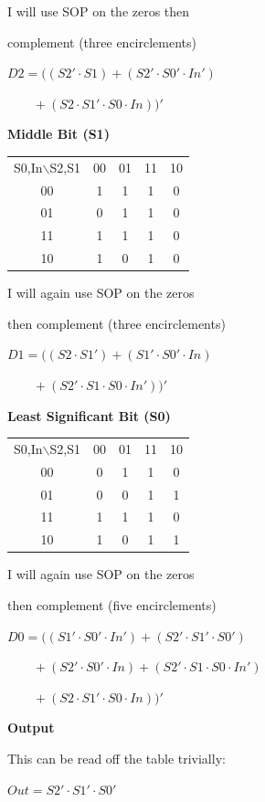 {    \vspace{6pt}

    I will use SOP on the zeros then

    \noindent complement (three encirclements)

    $D2=((S2'\cdot S1)+(S2'\cdot S0'\cdot In')$

    $\qquad +(S2\cdot S1'\cdot S0\cdot In))'$

    \vspace{6pt}


    \textbf{Middle Bit (S1)}

    \begin{tabular}{c|c|c|c|c|}
    \multicolumn{1}{c}{S0,In$\backslash$S2,S1} & \multicolumn{1}{c}{00} & \multicolumn{1}{c}{01} & \multicolumn{1}{c}{11} & \multicolumn{1}{c}{10} \\ \cline{2-5}
    00 & 1 & 1 & 1 & 0 \\ \cline{2-5}
    01 & 0 & 1 & 1 & 0 \\ \cline{2-5}
    11 & 1 & 1 & 1 & 0 \\ \cline{2-5}
    10 & 1 & 0 & 1 & 0 \\ \cline{2-5}
    \end{tabular}

    I will again use SOP on the zeros

    \noindent then complement (three encirclements)

    $D1=((S2\cdot S1')+(S1'\cdot S0'\cdot In)$

    $\qquad +(S2'\cdot S1\cdot S0\cdot In'))'$


    \pagebreak

    \textbf{Least Significant Bit (S0)}

    \begin{tabular}{c|c|c|c|c|}
    \multicolumn{1}{c}{S0,In$\backslash$S2,S1} & \multicolumn{1}{c}{00} & \multicolumn{1}{c}{01} & \multicolumn{1}{c}{11} & \multicolumn{1}{c}{10} \\ \cline{2-5}
    00 & 0 & 1 & 1 & 0 \\ \cline{2-5}
    01 & 0 & 0 & 1 & 1 \\ \cline{2-5}
    11 & 1 & 1 & 1 & 0 \\ \cline{2-5}
    10 & 1 & 0 & 1 & 1 \\ \cline{2-5}
    \end{tabular}

    I will again use SOP on the zeros

    \noindent then complement (five encirclements)

    $D0=((S1'\cdot S0'\cdot In')+(S2'\cdot S1'\cdot S0')$

    $\qquad +(S2'\cdot S0'\cdot In)+(S2'\cdot S1\cdot S0\cdot In')$

    $\qquad +(S2\cdot S1'\cdot S0\cdot In))'$

    \textbf{Output}

    This can be read off the table trivially:

    $Out = S2'\cdot S1'\cdot S0'$
    }



